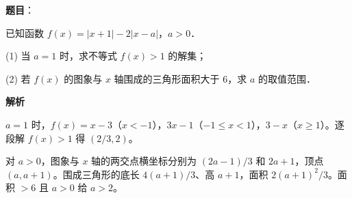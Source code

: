 \begin{answer}

\textbf{题目}：

已知函数 $f(x)=|x+1|-2|x-a|$，$a>0$．

(1) 当 $a=1$ 时，求不等式 $f(x)>1$ 的解集；

(2) 若 $f(x)$ 的图象与 $x$ 轴围成的三角形面积大于 $6$，求 $a$ 的取值范围．

\textbf{解析}


$a=1$ 时，$f(x)=x-3$（$x<-1$），$3x-1$（$-1\leqslant x<1$），$3-x$（$x\geqslant1$）。逐段解 $f(x)>1$ 得 $(2/3,2)$。


对 $a>0$，图象与 $x$ 轴的两交点横坐标分别为 $(2a-1)/3$ 和 $2a+1$，顶点 $(a,a+1)$。围成三角形的底长 $4(a+1)/3$、高 $a+1$，面积 $2(a+1)^2/3$。面积 $>6$ 且 $a>0$ 给 $a>2$。



\end{answer}
